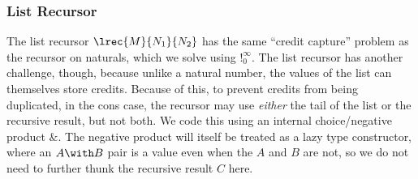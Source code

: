 \subsubsection{List Recursor}
The list recursor $\lrec {M} {N_1} {N_2}$ has the same ``credit
capture'' problem as the recursor on naturals, which we solve using
$!^\infty_0$.  The list recursor has another challenge, though,
because unlike a natural number, the values of the list can themselves
store credits.  Because of this, to prevent credits from being
duplicated, in the cons case, the recursor may use \emph{either} the
tail of the list or the recursive result, but not both.  We code this
using an internal choice/negative product $\&$.  The negative product
will itself be treated as a lazy type constructor, where an $A \with B$
pair is a value even when the $A$ and $B$ are not, so we do not need
to further thunk the recursive result $C$ here.





